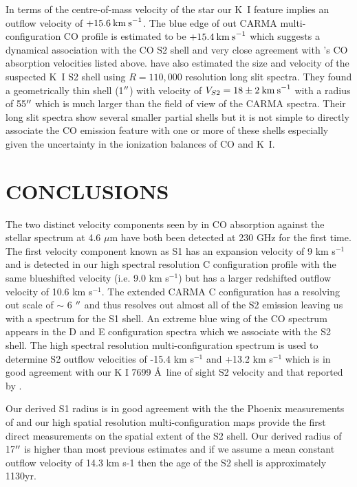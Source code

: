 \documentclass[apj]{emulateapj}
\begin{document}
In terms of the centre-of-mass velocity of the star our K~I feature implies an outflow velocity of $+15.6\>{\rm km\>s}^{-1}$. The blue edge of out CARMA multi-configuration CO profile is estimated to be $+15.4\>{\rm km\>s}^{-1}$  which suggests a dynamical association with the CO S2 shell and very close agreement with \citeauthor{1979ApJ...233L.135B}'s \citeyearpar{1979ApJ...233L.135B} CO absorption velocities listed above. \cite{2002A&A...386.1009P} have also estimated the size and velocity of the suspected K~I S2 shell using $R=110,000$ resolution long slit spectra. They found a geometrically thin shell (1$\mbox{$^{\prime\prime}$}$) with velocity of $V_{S2}=18\pm 2\>{\rm km\>s}^{-1}$ with a radius of 55$\mbox{$^{\prime\prime}$}$ which is much larger than the field of view of the CARMA spectra. Their long slit spectra show several smaller partial shells but it is not simple to directly associate the CO emission feature with one or more of these shells especially given the uncertainty in the ionization balances of CO and K~I.

\section{CONCLUSIONS}
The two distinct velocity components seen by \cite{1979ApJ...233L.135B} in CO absorption against the stellar spectrum at 4.6 $\mu$m have both been detected at 230 GHz for the first time. The first velocity component known as S1 has an expansion velocity of 9 km s${}^{-1}$ \citep{1979ApJ...233L.135B} and is detected in our high spectral resolution C configuration profile with the same blueshifted velocity (i.e. 9.0 km s${}^{-1}$) but has a larger redshifted outflow velocity of 10.6 km s${}^{-1}$. The extended CARMA C configuration has a resolving out scale of $\sim$ 6 $\mbox{$^{\prime\prime}$}$ and thus resolves out almost all of the S2 emission leaving us with a spectrum for the S1 shell. An extreme blue wing of the CO spectrum appears in the D and E configuration spectra which we associate with the S2 shell. The high spectral resolution multi-configuration spectrum is used to determine S2 outflow velocities of -15.4 km s${}^{-1}$ and +13.2 km s${}^{-1}$ which is in good agreement with our K I 7699 \AA \ line of sight S2 velocity and that reported by \cite{1979ApJ...233L.135B}. 

Our derived S1 radius is in good agreement with the the Phoenix measurements of \cite{2009AJ....137.3558S} and our high spatial resolution multi-configuration maps provide the first direct measurements on the spatial extent of the S2 shell. Our derived radius of 17$\mbox{$^{\prime\prime}$}$ is higher than most previous estimates and if we assume a mean constant outflow velocity of 14.3 km s-1 then the age of the S2  shell is approximately 1130yr. 
\end{document}
